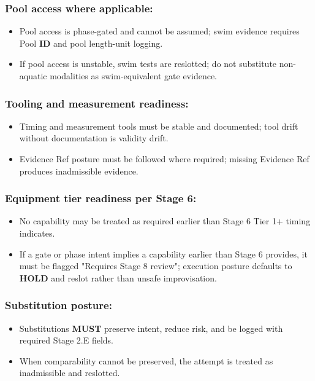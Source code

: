 \documentclass[10pt]{article}
\begin{document}
\subsubsection*{Pool access where applicable:}

\begin{itemize}
\item Pool access is phase-gated and cannot be assumed; swim evidence requires Pool \textbf{ID} and pool length-unit logging.
\item If pool access is unstable, swim tests are reslotted; do not substitute non-aquatic modalities as swim-equivalent gate evidence.
\end{itemize}

\subsubsection*{Tooling and measurement readiness:}

\begin{itemize}
\item Timing and measurement tools must be stable and documented; tool drift without documentation is validity drift.
\item Evidence Ref posture must be followed where required; missing Evidence Ref produces inadmissible evidence.
\end{itemize}

\subsubsection*{Equipment tier readiness per Stage 6:}

\begin{itemize}
\item No capability may be treated as required earlier than Stage 6 Tier 1+ timing indicates.
\item If a gate or phase intent implies a capability earlier than Stage 6 provides, it must be flagged "Requires Stage 8 review"; execution posture defaults to \textbf{HOLD} and reslot rather than unsafe improvisation.
\end{itemize}

\subsubsection*{Substitution posture:}

\begin{itemize}
\item Substitutions \textbf{MUST} preserve intent, reduce risk, and be logged with required Stage 2.E fields.
\item When comparability cannot be preserved, the attempt is treated as inadmissible and reslotted.
\end{itemize}
\end{document}

